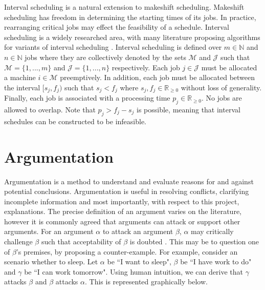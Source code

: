 Interval scheduling is a natural extension to makeshift scheduling. Makeshift scheduling has freedom in determining the starting times of its jobs. In practice, rearranging critical jobs may effect the feasibility of a schedule. Interval scheduling is a widely researched area, with many literature proposing algorithms for variants of interval scheduling \cite{is}.
\linespace
Interval scheduling is defined over $m\in\mathbb{N}$ and $n\in\mathbb{N}$ jobs where they are collectively denoted by the sets $\mathcal{M}$ and $\mathcal{J}$ such that $\mathcal{M}=\{1,...,m\}$ and $\mathcal{J}=\{1,...,n\}$ respectively. Each job $j\in\mathcal{J}$ must be allocated a machine $i\in\mathcal{M}$ preemptively. In addition, each job must be allocated between the interval $[s_j,f_j)$ such that $s_j<f_j$ where $s_j,f_j\in\mathbb{R}_{\geq 0}$ without loss of generality. Finally, each job is associated with a processing time $p_j\in\mathbb{R}_{\geq 0}$. No jobs are allowed to overlap. Note that $p_j>f_j-s_j$ is possible, meaning that interval schedules can be constructed to be infeasible.

\section{Argumentation}

Argumentation is a method to understand and evaluate reasons for and against potential conclusions. Argumentation is useful in resolving conflicts, clarifying incomplete information and most importantly, with respect to this project, explanations. The precise definition of an argument varies on the literature, however it is commonly agreed that arguments can attack or support other arguments. For an argument $\alpha$ to attack an argument $\beta$, $\alpha$ may critically challenge $\beta$ such that acceptability of $\beta$ is doubted \cite{at}. This may be to question one of $\beta$'s premises, by proposing a counter-example. For example, consider an scenario whether to sleep. Let $\alpha$ be ``I want to sleep", $\beta$ be ``I have work to do" and $\gamma$ be ``I can work tomorrow". Using human intuition, we can derive that $\gamma$ attacks $\beta$ and $\beta$ attacks $\alpha$. This is represented graphically below.

\begin{center}
\end{center}

